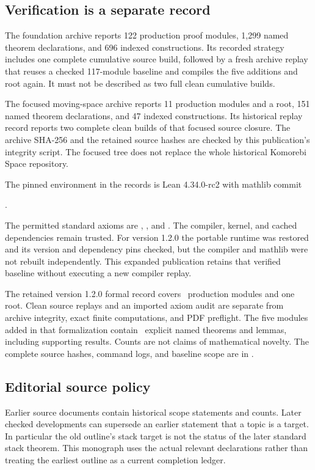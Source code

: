 \par\noindent\begin{minipage}{\linewidth}\subsection{Verification is a separate record}
The foundation archive reports 122 production proof modules, 1,299 named theorem declarations, and 696 indexed constructions. Its recorded strategy includes one complete cumulative source build, followed by a fresh archive replay that reuses a checked 117-module baseline and compiles the five additions and root again. It must not be described as two full clean cumulative builds.

The focused moving-space archive reports 11 production modules and a root, 151 named theorem declarations, and 47 indexed constructions. Its historical replay record reports two complete clean builds of that focused source closure. The archive SHA-256 and the retained source hashes are checked by this publication's integrity script. The focused tree does not replace the whole historical Komorebi Space repository.

The pinned environment in the records is Lean 4.34.0-rc2 with mathlib commit\par\smallskip\noindent{}.\par\smallskip The permitted standard axioms are , , and . The compiler, kernel, and cached dependencies remain trusted. For version 1.2.0 the portable runtime was restored and its version and dependency pins checked, but the compiler and mathlib were not rebuilt independently. This expanded publication retains that verified baseline without executing a new compiler replay.

The retained version 1.2.0 formal record covers \EditionFormalModules\ production modules and one root. Clean source replays and an imported axiom audit are separate from archive integrity, exact finite computations, and PDF preflight. The five modules added in that formalization contain \EditionNewTheorems\ explicit named theorems and lemmas, including supporting results. Counts are not claims of mathematical novelty. The complete source hashes, command logs, and baseline scope are in .

\end{minipage}

\subsection*{Editorial source policy}
Earlier source documents contain historical scope statements and counts. Later checked developments can supersede an earlier statement that a topic is a target. In particular the old outline's stack target is not the status of the later standard stack theorem. This monograph uses the actual relevant declarations rather than treating the earliest outline as a current completion ledger.



